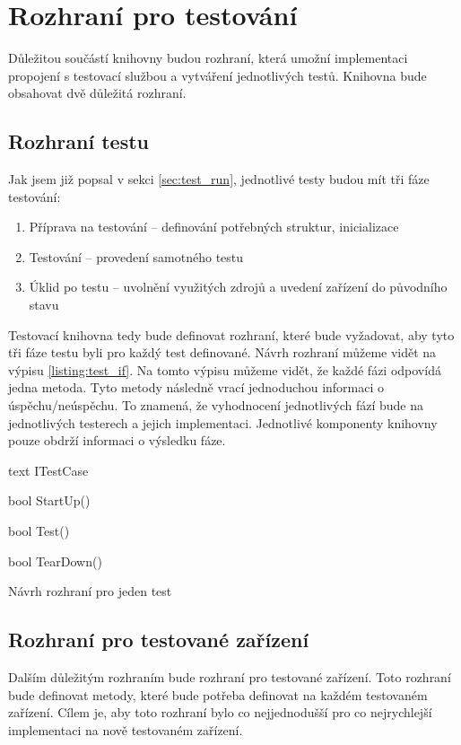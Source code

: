 \section{Rozhraní pro testování}
Důležitou součástí knihovny budou rozhraní, která umožní implementaci propojení s testovací službou a vytváření jednotlivých testů. Knihovna bude obsahovat dvě důležitá rozhraní. 

\subsection{Rozhraní testu}
Jak jsem již popsal v sekci \ref{sec:test_run}, jednotlivé testy budou mít tři fáze testování:

\begin{enumerate}
    \item Příprava na testování -- definování potřebných struktur, inicializace
    \item Testování -- provedení samotného testu
    \item Úklid po testu -- uvolnění využitých zdrojů a uvedení zařízení do původního stavu
\end{enumerate}

Testovací knihovna tedy bude definovat rozhraní, které bude vyžadovat, aby tyto tři fáze testu byli pro každý test definované. Návrh rozhraní můžeme vidět na výpisu \ref{listing:test_if}. Na tomto výpisu můžeme vidět, že každé fázi odpovídá jedna metoda. Tyto metody následně vrací jednoduchou informaci o úspěchu/neúspěchu. To znamená, že vyhodnocení jednotlivých fází bude na jednotlivých testerech a jejich implementaci. Jednotlivé komponenty knihovny pouze obdrží informaci o výsledku fáze.

\begin{listing}[htbp]
    \centering
    \begin{cminted}[breaklines]{text}
ITestCase 
{
    bool StartUp()

    bool Test()

    bool TearDown()
}
    \end{cminted}
\caption{Návrh rozhraní pro jeden test}
\label{listing:test_if}
\end{listing}


\subsection{Rozhraní pro testované zařízení}\label{sec:deviceif}

Dalším důležitým rozhraním bude rozhraní pro testované zařízení. Toto rozhraní bude definovat metody, které bude potřeba definovat na každém testovaném zařízení. Cílem je, aby toto rozhraní bylo co nejjednodušší pro co nejrychlejší implementaci na nově testovaném zařízení.

